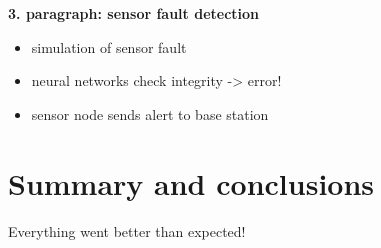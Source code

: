 \documentclass[12pt,a4paper]{scrartcl}
\begin{document}
\textbf{3. paragraph: sensor fault detection}

\begin{itemize}
\item simulation of sensor fault
\item neural networks check integrity -> error!
\item sensor node sends alert to base station
\end{itemize}




\section*{Summary and conclusions}

Everything went better than expected!



\end{document}
